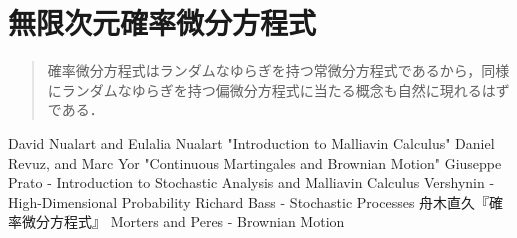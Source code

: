 \documentclass[uplatex,dvipdfmx]{jsreport}
\begin{document}
\chapter{無限次元確率微分方程式}

\begin{quotation}
    確率微分方程式はランダムなゆらぎを持つ常微分方程式であるから，同様にランダムなゆらぎを持つ偏微分方程式に当たる概念も自然に現れるはずである．
\end{quotation}

\begin{thebibliography}{99}
    David Nualart and Eulalia Nualart "Introduction to Malliavin Calculus"
    Daniel Revuz, and Marc Yor "Continuous Martingales and Brownian Motion"
    Giuseppe Prato - Introduction to Stochastic Analysis and Malliavin Calculus
    Vershynin -  High-Dimensional Probability
    Richard Bass - Stochastic Processes
    舟木直久『確率微分方程式』
    Morters and Peres - Brownian Motion
\end{thebibliography}
\end{document}
